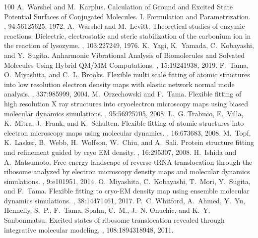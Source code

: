 \documentclass[a4paper,11pt,oneside,english]{sphinxmanual}
\begin{document}
\begin{sphinxthebibliography}{100}
A. Warshel and M. Karplus. Calculation of Ground and Excited State Potential Surfaces of Conjugated Molecules. I. Formulation and Parametrization. , 94:5612\textendash{}5625, 1972.
A. Warshel and M. Levitt. Theoretical studies of enzymic reactions: Dielectric, electrostatic and steric stabilization of the carbonium ion in the reaction of lysozyme. , 103:227\textendash{}249, 1976.
K. Yagi, K. Yamada, C. Kobayashi, and Y. Sugita. Anharmonic Vibrational Analysis of Biomolecules and Solvated Molecules Using Hybrid QM/MM Computations. , 15:1924\textendash{}1938, 2019.
F. Tama, O. Miyashita, and C. L. Brooks. Flexible multi scale fitting of atomic structures into low resolution electron density maps with elastic network normal mode analysis. , 337:985\textendash{}999, 2004.
M. Orzechowski and F. Tama. Flexible fitting of high resolution X ray structures into cryoelectron microscopy maps using biased molecular dynamics simulations. , 95:5692\textendash{}5705, 2008.
L. G. Trabuco, E. Villa, K. Mitra, J. Frank, and K. Schulten. Flexible fitting of atomic structures into electron microscopy maps using molecular dynamics. , 16:673\textendash{}683, 2008.
M. Topf, K. Lasker, B. Webb, H. Wolfson, W. Chiu, and A. Sali. Protein structure fitting and refinement guided by cryo EM density. , 16:295\textendash{}307, 2008.
H. Ishida and A. Matsumoto. Free energy landscape of reverse tRNA translocation through the ribosome analyzed by electron microscopy density maps and molecular dynamics simulations. , 9:e101951, 2014.
O. Miyashita, C. Kobayashi, T. Mori, Y. Sugita, and F. Tama. Flexible fitting to cryo-EM density map using ensemble molecular dynamics simulations. , 38:1447\textendash{}1461, 2017.
P. C. Whitford, A. Ahmed, Y. Yu, Hennelly, S. P., F. Tama, Spahn, C. M., J. N. Onuchic, and K. Y. Sanbonmatsu. Excited states of ribosome translocation revealed through integrative molecular modeling. , 108:18943\textendash{}18948, 2011.

\end{sphinxthebibliography}
\end{document}
